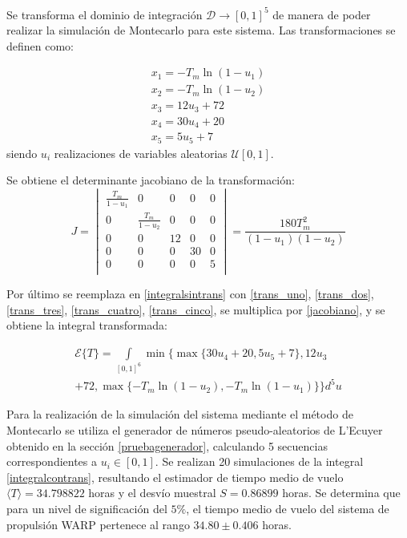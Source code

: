 \documentclass{sig-alternate}
\begin{document}
Se transforma el dominio de integraci\'on $\mathcal{D} \to [0,1]^5$ de manera de poder 
realizar la simulaci\'on de Montecarlo para este sistema. Las transformaciones se definen como:

\begin{eqnarray}
	\label{trans_uno}
	x_1 = - T_m \ln (1 - u_1) \\
	\label{trans_dos}
	x_2 = - T_m \ln (1 - u_2) \\
	\label{trans_tres}
	x_3 = 12 u_3 + 72 \\
	\label{trans_cuatro}
	x_4 = 30 u_4 + 20 \\
	\label{trans_cinco}
	x_5 = 5 u_5 + 7
\end{eqnarray}
siendo $u_i$ realizaciones de variables aleatorias $\mathcal{U}[0,1]$.

Se obtiene el determinante jacobiano de la transformaci\'on:
\begin{equation}
	\label{jacobiano}
	J =
		\begin{vmatrix}
			\frac{T_m}{1 - u_1} & 0  & 0  & 0  & 0 \\
			0 & \frac{T_m}{1 - u_2} & 0  & 0  & 0  \\
			0 & 0 & 12 & 0 & 0 \\
			0 & 0 & 0 & 30  & 0 \\
			0 & 0 & 0 & 0 & 5 \\
		\end{vmatrix}
	=
		\frac{180 T_m^2}{(1-u_1)(1-u_2)}
\end{equation}

Por \'ultimo se reemplaza en \eqref{integralsintrans} con
\eqref{trans_uno}, \eqref{trans_dos}, \eqref{trans_tres}, \eqref{trans_cuatro}, \eqref{trans_cinco}, 
se multiplica por \eqref{jacobiano}, y se obtiene la integral transformada:

\begin{eqnarray}
\label{integralcontrans}
	\mathcal{E} \{ T \} =	\int\limits_{[0,1]^6} \min\{ \max \{ 30 u_4 + 20, 5 u_5 + 7 \} , 12 u_3
	\nonumber
	\\
	 + 72 , \max \{- T_m \ln (1 - u_2), - T_m \ln (1 - u_1)\}\} d^5u
\end{eqnarray}

Para la realizaci\'on de la simulaci\'on del sistema mediante el m\'etodo de Montecarlo 
se utiliza el generador de n\'umeros pseudo-aleatorios de L'Ecuyer obtenido en la secci\'on \ref{pruebagenerador},
calculando 5 secuencias correspondientes a $u_i \in [0,1]$. Se realizan 20 simulaciones  
de la integral \eqref{integralcontrans}, resultando el
estimador de tiempo medio de vuelo $\langle T \rangle = 34.798822$ horas y el desv\'io muestral
$S = 0.86899$ horas. Se determina que para un nivel de significaci\'on del $5\%$, el tiempo medio de vuelo
del sistema de propulsi\'on WARP pertenece al rango $ 34.80 \pm 0.406 $ horas.
\end{document}
